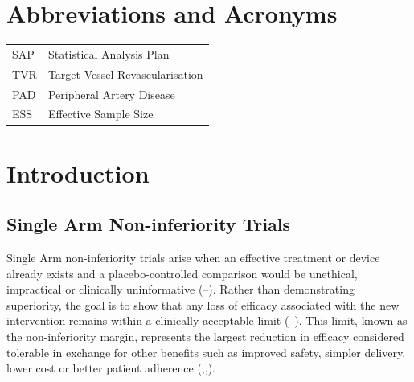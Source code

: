 \documentclass{article}
\begin{document}
\newpage
\tableofcontents
\newpage
\listoffigures
\listoftables
\newpage

\section*{Abbreviations and Acronyms}\label{abbreviations-and-acronyms}

\begin{tabular}{ll}
SAP & Statistical Analysis Plan \\
TVR & Target Vessel Revascularisation \\
PAD & Peripheral Artery Disease \\
ESS & Effective Sample Size \\
\end{tabular}

\newpage

\section{Introduction}\label{introduction}

\subsection{Single Arm Non-inferiority
Trials}\label{single-arm-non-inferiority-trials}

Single Arm non-inferiority trials arise when an effective treatment or
device already exists and a placebo-controlled comparison would be
unethical, impractical or clinically uninformative
(--).
Rather than demonstrating superiority, the goal is to show that any loss
of efficacy associated with the new intervention remains within a
clinically acceptable limit
(--).
This limit, known as the non-inferiority margin, represents the largest
reduction in efficacy considered tolerable in exchange for other
benefits such as improved safety, simpler delivery, lower cost or better
patient adherence
(,,).
\end{document}

